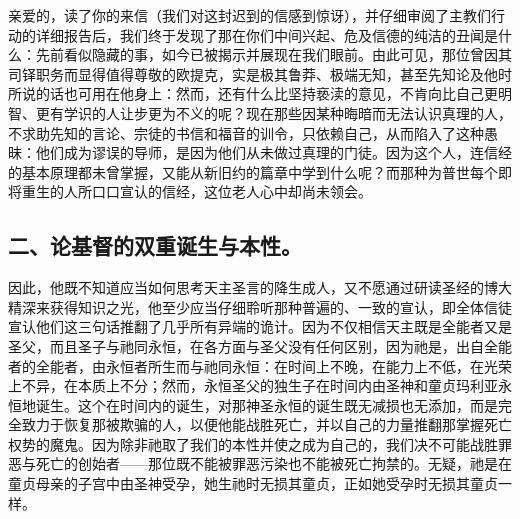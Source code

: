 亲爱的，读了你的来信（我们对这封迟到的信感到惊讶），并仔细审阅了主教们行动的详细报告后，我们终于发现了那在你们中间兴起、危及信德的纯洁的丑闻是什么：先前看似隐藏的事，如今已被揭示并展现在我们眼前。由此可见，那位曾因其司铎职务而显得值得尊敬的欧提克，实是极其鲁莽、极端无知，甚至先知论及他时所说的话也可用在他身上：然而，还有什么比坚持亵渎的意见，不肯向比自己更明智、更有学识的人让步更为不义的呢？现在那些因某种晦暗而无法认识真理的人，不求助先知的言论、宗徒的书信和福音的训令，只依赖自己，从而陷入了这种愚昧：他们成为谬误的导师，是因为他们从未做过真理的门徒。因为这个人，连信经的基本原理都未曾掌握，又能从新旧约的篇章中学到什么呢？而那种为普世每个即将重生的人所口口宣认的信经，这位老人心中却尚未领会。\par


\subsection{二、论基督的双重诞生与本性。}

因此，他既不知道应当如何思考天主圣言的降生成人，又不愿通过研读圣经的博大精深来获得知识之光，他至少应当仔细聆听那种普遍的、一致的宣认，即全体信徒宣认他们这三句话推翻了几乎所有异端的诡计。因为不仅相信天主既是全能者又是圣父，而且圣子与祂同永恒，在各方面与圣父没有任何区别，因为祂是，出自全能者的全能者，由永恒者所生而与祂同永恒：在时间上不晚，在能力上不低，在光荣上不异，在本质上不分；然而，永恒圣父的独生子在时间内由圣神和童贞玛利亚永恒地诞生。这个在时间内的诞生，对那神圣永恒的诞生既无减损也无添加，而是完全致力于恢复那被欺骗的人，以便他能战胜死亡，并以自己的力量推翻那掌握死亡权势的魔鬼。因为除非祂取了我们的本性并使之成为自己的，我们决不可能战胜罪恶与死亡的创始者——那位既不能被罪恶污染也不能被死亡拘禁的。无疑，祂是在童贞母亲的子宫中由圣神受孕，她生祂时无损其童贞，正如她受孕时无损其童贞一样。\par

